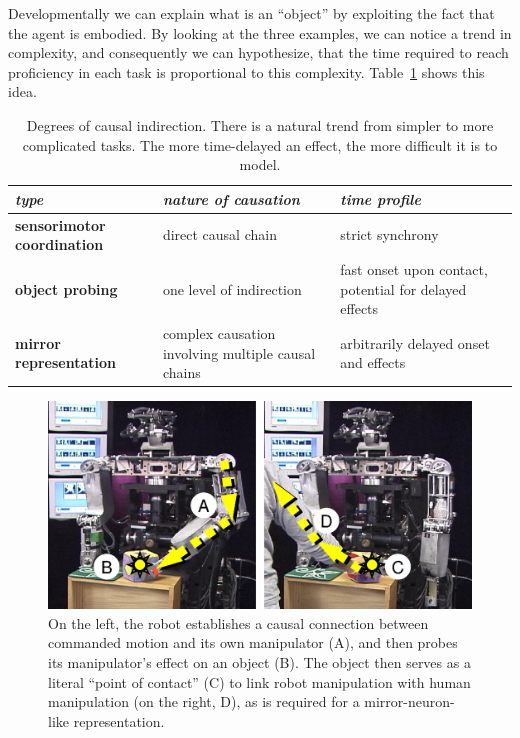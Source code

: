Developmentally we can explain what is an ``object'' by exploiting
the fact that the agent is embodied.
By looking at the three examples, we can notice a trend in complexity, 
and consequently we can hypothesize, that the time required to reach proficiency 
in each task is proportional to this complexity. Table~\ref{tab:causation} shows this idea.
\fi

\ifverbose
\begin{table}[htbp]
\begin{center}
\begin{tabular}{|p{4.8cm}|p{4.8cm}|p{4.8cm}|}
\hline
{\it type} & {\it nature of causation} &  {\it time profile} \\ \hline\hline
{\bf sensorimotor coordination} & direct causal chain & strict synchrony \\ \hline
{\bf object probing} & one level of indirection & fast onset upon contact, potential for delayed effects\\ \hline
{\bf mirror representation} &  complex causation involving multiple causal chains & arbitrarily delayed onset and effects\\ \hline
\end{tabular}
\caption{
\label{tab:causation}
%
Degrees of causal indirection. There is a natural
trend from simpler to more complicated tasks.  The more time-delayed
an effect, the more difficult it is to model.
%
}
\end{center}
\end{table}
\fi

%
\begin{figure}[tb]
\begin{center}
\includegraphics[width=\columnwidth]{tracing_causes.eps}
\caption{ 
\label{fig:tracing-causes}
%
On the left, the robot establishes a causal connection between
commanded motion and its own manipulator (A), and then probes its
manipulator's effect on an object (B).  The object then serves as a
literal ``point of contact'' (C) to link robot manipulation with human
manipulation (on the right, D), as is required for a mirror-neuron-like
representation.
%
}
\end{center}
\end{figure}
%



